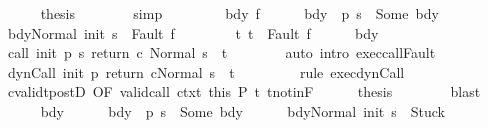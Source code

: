 \begin{isabellebody}
\ \ \ \ \isamarkupfalse%
\ {\isacharquery}thesis\isanewline
\ \ \ \ \ \ \isamarkupfalse%
\ simp\isanewline
\ \ \isamarkupfalse%
\isanewline
\ \ \ \ \isamarkupfalse%
\ bdy\ f\isanewline
\ \ \ \ \isamarkupfalse%
\ bdy{\isacharcolon}\ {\isachardoublequoteopen}{\isasymGamma}\ {\isacharparenleft}p\ s{\isacharparenright}\ {\isacharequal}\ Some\ bdy{\isachardoublequoteclose}\isanewline
\ \ \ \ \isamarkupfalse%
\ {\isachardoublequoteopen}{\isasymGamma}{\isasymturnstile}{\isasymlangle}bdy{\isacharcomma}Normal\ {\isacharparenleft}init\ s{\isacharparenright}{\isasymrangle}\ {\isasymRightarrow}\ Fault\ f{\isachardoublequoteclose}\ \ \isanewline
\ \ \ \ \ \ t{\isacharcolon}\ {\isachardoublequoteopen}t\ {\isacharequal}\ Fault\ f{\isachardoublequoteclose}\isanewline
\ \ \ \ \isamarkupfalse%
\ bdy\ \isamarkupfalse%
\ {\isachardoublequoteopen}{\isasymGamma}{\isasymturnstile}{\isasymlangle}call\ init\ {\isacharparenleft}p\ s{\isacharparenright}\ return{\isacharprime}\ c\ {\isacharcomma}Normal\ s{\isasymrangle}\ {\isasymRightarrow}\ t{\isachardoublequoteclose}\isanewline
\ \ \ \ \ \ \isamarkupfalse%
\ {\isacharparenleft}auto\ intro{\isacharcolon}\ exec{\isacharunderscore}callFault{\isacharparenright}\isanewline
\ \ \ \ \isamarkupfalse%
\ {\isachardoublequoteopen}{\isasymGamma}{\isasymturnstile}{\isasymlangle}dynCall\ init\ p\ return{\isacharprime}\ c{\isacharcomma}Normal\ s{\isasymrangle}\ {\isasymRightarrow}\ t{\isachardoublequoteclose}\ \isanewline
\ \ \ \ \ \ \isamarkupfalse%
\ {\isacharparenleft}rule\ exec{\isacharunderscore}dynCall{\isacharparenright}\isanewline
\ \ \ \ \isamarkupfalse%
\ cvalidt{\isacharunderscore}postD\ {\isacharbrackleft}OF\ valid{\isacharunderscore}call\ ctxt\ this\ P{\isacharbrackright}\ t\ t{\isacharunderscore}notin{\isacharunderscore}F\isanewline
\ \ \ \ \isamarkupfalse%
\ {\isacharquery}thesis\isanewline
\ \ \ \ \ \ \isamarkupfalse%
\ blast\isanewline
\ \ \isamarkupfalse%
\isanewline
\ \ \ \ \isamarkupfalse%
\ bdy\isanewline
\ \ \ \ \isamarkupfalse%
\ bdy{\isacharcolon}\ {\isachardoublequoteopen}{\isasymGamma}\ {\isacharparenleft}p\ s{\isacharparenright}\ {\isacharequal}\ Some\ bdy{\isachardoublequoteclose}\isanewline
\ \ \ \ \isamarkupfalse%
\ {\isachardoublequoteopen}{\isasymGamma}{\isasymturnstile}{\isasymlangle}bdy{\isacharcomma}Normal\ {\isacharparenleft}init\ s{\isacharparenright}{\isasymrangle}\ {\isasymRightarrow}\ Stuck{\isachardoublequoteclose}\ \ \isanewline

\end{isabellebody}
